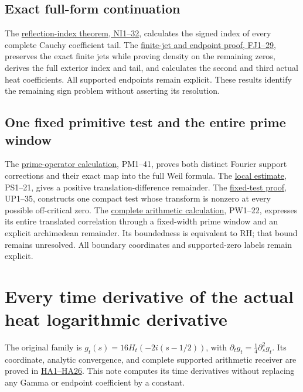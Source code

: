 \documentclass[
  10pt,
  a4paper,
]{article}
\begin{document}
\subsection{Exact full-form
continuation}\label{exact-full-form-continuation-2}

The \href{CAUCHY_REFLECTION_INDEX_DERIVATION.md}{reflection-index
theorem, NI1--32}, calculates the signed index of every complete Cauchy
coefficient tail. The
\href{FINITE_JET_COMPLEMENT_AND_HEAT_TRUNCATION.md}{finite-jet and
endpoint proof, FJ1--29}, preserves the exact finite jets while proving
density on the remaining zeros, derives the full exterior index and
tail, and calculates the second and third actual heat coefficients. All
supported endpoints remain explicit. These results identify the
remaining sign problem without asserting its resolution.

\subsection{One fixed primitive test and the entire prime
window}\label{one-fixed-primitive-test-and-the-entire-prime-window-1}

The \href{PRIME_PROJECTOR_MOBIUS_DERIVATION.md}{prime-operator
calculation}, PM1--41, proves both distinct Fourier support corrections
and their exact map into the full Weil formula. The
\href{PRIMITIVE_SHORT_SUPPORT_DERIVATION.md}{local estimate}, PS1--21,
gives a positive translation-difference remainder. The
\href{UNIVERSAL_PRIMITIVE_TRANSLATION_CRITERION.md}{fixed-test proof},
UP1--35, constructs one compact test whose transform is nonzero at every
possible off-critical zero. The
\href{PRIMITIVE_PRIME_WINDOW_DERIVATION.md}{complete arithmetic
calculation}, PW1--22, expresses its entire translated correlation
through a fixed-width prime window and an explicit archimedean
remainder. Its boundedness is equivalent to RH; that bound remains
unresolved. All boundary coordinates and supported-zero labels remain
explicit.

\clearpage

\section{Every time derivative of the actual heat logarithmic
derivative}\label{every-time-derivative-of-the-actual-heat-logarithmic-derivative}

The original family is \(g_t(s)=16H_t(-2i(s-1/2))\), with
\(\partial_tg_t=\tfrac14\partial_s^2g_t\). Its coordinate, analytic
convergence, and complete supported arithmetic receiver are proved in
\href{HEAT_CAUCHY_ARITHMETIC_DERIVATION.md}{HA1--HA26}. This note
computes its time derivatives without replacing any Gamma or endpoint
coefficient by a constant.
\end{document}
